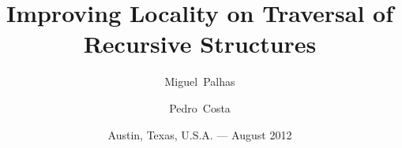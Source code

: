 \title[Improving Locality]{Improving Locality on Traversal of Recursive Structures}

\author[M.~Palhas\and P.~Costa]{Miguel~Palhas\and Pedro~Costa}

\date[Austin, TX - August 2012]{Austin, Texas, U.S.A. --- August 2012}

\subject{Summer Internship}

